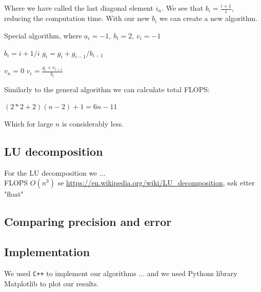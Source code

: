 \documentclass[american,a4paper,12pt]{article}
\begin{document}
Where we have called the last diagonal element $i_n$. We see that $b_i = \frac{i+1}{i}$, reducing the computation time. With our new $b_i$ we can create a new algorithm.
\begin{algorithm}
\caption{Special algorithm, where $a_i = -1,\ b_i = 2,\ c_i = -1$}
\begin{algorithmic}[1]
   
    \State $b_i = {i+1}/i$ 
    \State $g_i = g_i + {g}_{i-1}/{{b}_{i-1}}$ 
  \EndFor

  \Statex
  \State $v_n = 0$ 
    \State $v_i = \frac{g_i + v_{i+1}}{b_i}$
  \EndFor
\end{algorithmic}
\end{algorithm}

Similarly to the general algorithm we can calculate total FLOPS:
\begin{center}
    $(2*2+2)(n-2)+1 = 6n-11$
\end{center}
Which for large $n$ is considerably less.
\subsection{LU decomposition}
For the LU decomposition we ...\\
FLOPS $O(n^3)$ se \url{https://en.wikipedia.org/wiki/LU_decomposition}, søk etter "float"

\subsection{Comparing precision and error}


\subsection{Implementation}
We used \verb!C++! to implement our algorithms ... and we used Pythons library Matplotlib to plot our results.
\end{document}
